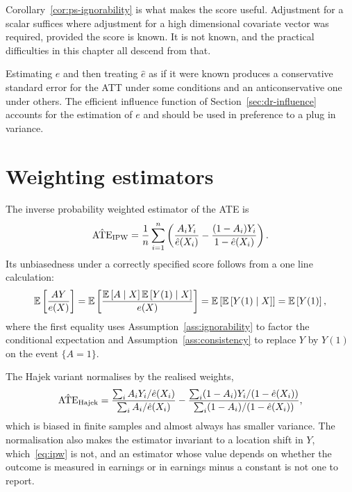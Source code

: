 Corollary~\ref{cor:ps-ignorability} is what makes the score useful. Adjustment
for a scalar suffices where adjustment for a high dimensional covariate vector
was required, provided the score is known. It is not known, and the practical
difficulties in this chapter all descend from that.

\begin{remark}
\label{rem:estimated-score}
Estimating $e$ and then treating $\hat{e}$ as if it were known produces a
conservative standard error for the ATT under some conditions and an
anticonservative one under others. The efficient influence function
of Section~\ref{sec:dr-influence} accounts for the estimation of $e$ and should
be used in preference to a plug in variance.
\end{remark}

\section{Weighting estimators}
\label{sec:ps-weighting}

The inverse probability weighted estimator
of the ATE is
\begin{equation}
  \hat{\mathrm{ATE}}_{\mathrm{IPW}}
    = \frac{1}{n} \sum_{i=1}^{n}
      \left( \frac{A_i Y_i}{\hat{e}(X_i)}
           - \frac{(1 - A_i) Y_i}{1 - \hat{e}(X_i)} \right).
  \label{eq:ipw}
\end{equation}
Its unbiasedness under a correctly specified score follows from a one line
calculation:
\begin{equation}
  \mathbb{E}\left[ \frac{A Y}{e(X)} \right]
    = \mathbb{E}\left[ \frac{\mathbb{E}\left[ A \mid X \right] \mathbb{E}\left[ Y(1) \mid X \right]}{e(X)} \right]
    = \mathbb{E}\left[ \mathbb{E}\left[ Y(1) \mid X \right] \right]
    = \mathbb{E}\left[ Y(1) \right],
  \label{eq:ipw-unbiased}
\end{equation}
where the first equality uses Assumption~\ref{ass:ignorability} to factor the
conditional expectation and Assumption~\ref{ass:consistency} to
replace $Y$ by $Y(1)$ on the event $\{A = 1\}$.

The Hajek variant normalises by the realised weights,
\begin{equation}
  \hat{\mathrm{ATE}}_{\mathrm{Hajek}}
    = \frac{\sum_i A_i Y_i / \hat{e}(X_i)}{\sum_i A_i / \hat{e}(X_i)}
    - \frac{\sum_i (1 - A_i) Y_i / (1 - \hat{e}(X_i))}{\sum_i (1 - A_i) / (1 - \hat{e}(X_i))},
  \label{eq:hajek}
\end{equation}
which is biased in finite samples and almost always has smaller variance. The
normalisation also makes the estimator invariant to a location shift in $Y$,
which~\eqref{eq:ipw} is not, and an estimator whose value depends on whether the
outcome is measured in earnings or in earnings minus a constant is not one to
report.

